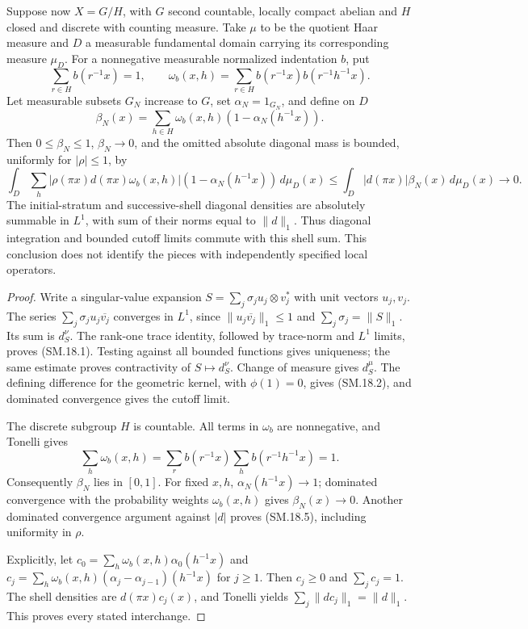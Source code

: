 \documentclass[11pt,a4paper]{article}
\theoremstyle{definition}\newtheorem{definition}[theorem]{Definition}
\theoremstyle{remark}\newtheorem{remark}[theorem]{Remark}
\begin{document}
Suppose now $X=G/H$, with $G$ second countable, locally compact
abelian and $H$ closed and discrete with counting measure.
Take $\mu$ to be the quotient Haar measure and $D$ a measurable
fundamental domain carrying its corresponding measure $\mu_D$.
For a nonnegative measurable normalized indentation $b$, put
\[
 \sum_{r\in H}b(r^{-1}x)=1,\qquad
 \omega_b(x,h)=\sum_{r\in H}b(r^{-1}x)b(r^{-1}h^{-1}x).
 \tag{SM.18.3}
\]
Let measurable subsets $G_N$ increase to $G$, set
$\alpha_N=1_{G_N}$, and define on $D$
\[
 \beta_N(x)=\sum_{h\in H}\omega_b(x,h)
                       (1-\alpha_N(h^{-1}x)).
 \tag{SM.18.4}
\]
Then $0\leq\beta_N\leq1$, $\beta_N\to0$, and the omitted
absolute diagonal mass is bounded, uniformly for $|\rho|\leq1$, by
\[
 \int_D\sum_h|\rho(\pi x)d(\pi x)\omega_b(x,h)|
                 (1-\alpha_N(h^{-1}x))\,d\mu_D(x)
 \leq \int_D|d(\pi x)|\beta_N(x)\,d\mu_D(x)\longrightarrow0.
 \tag{SM.18.5}
\]
The initial-stratum and successive-shell diagonal densities
are absolutely summable in $L^1$, with sum of their norms equal
to $\|d\|_1$.  Thus diagonal integration and bounded cutoff
limits commute with this shell sum.  This conclusion does not
identify the pieces with independently specified local operators.

\begin{proof}
Write a singular-value expansion
$S=\sum_j\sigma_j u_j\otimes v_j^*$ with unit vectors $u_j,v_j$.
The series $\sum_j\sigma_j u_j\overline{v_j}$ converges in $L^1$,
since $\|u_j\overline{v_j}\|_1\leq1$ and
$\sum_j\sigma_j=\|S\|_1$.  Its sum is $d_S^\nu$.
The rank-one trace identity, followed by trace-norm and $L^1$
limits, proves (SM.18.1).  Testing against all bounded functions
gives uniqueness; the same estimate proves contractivity of
$S\mapsto d_S^\nu$.  Change of measure gives $d_S^\mu$.
The defining difference for the geometric kernel, with $\phi(1)=0$,
gives (SM.18.2), and dominated convergence gives the cutoff limit.

The discrete subgroup $H$ is countable.  All terms in $\omega_b$
are nonnegative, and Tonelli gives
\[
 \sum_h\omega_b(x,h)
 =\sum_r b(r^{-1}x)\sum_h b(r^{-1}h^{-1}x)=1.
 \tag{SM.18.6}
\]
Consequently $\beta_N$ lies in $[0,1]$.  For fixed $x,h$,
$\alpha_N(h^{-1}x)\to1$; dominated convergence with the
probability weights $\omega_b(x,h)$ gives $\beta_N(x)\to0$.
Another dominated convergence argument against $|d|$ proves
(SM.18.5), including uniformity in $\rho$.

Explicitly, let $c_0=\sum_h\omega_b(x,h)\alpha_0(h^{-1}x)$
and $c_j=\sum_h\omega_b(x,h)(\alpha_j-\alpha_{j-1})(h^{-1}x)$
for $j\geq1$.  Then $c_j\geq0$ and $\sum_jc_j=1$.
The shell densities are $d(\pi x)c_j(x)$, and Tonelli yields
$\sum_j\|dc_j\|_1=\|d\|_1$.  This proves every stated interchange.
\end{proof}
\end{document}
